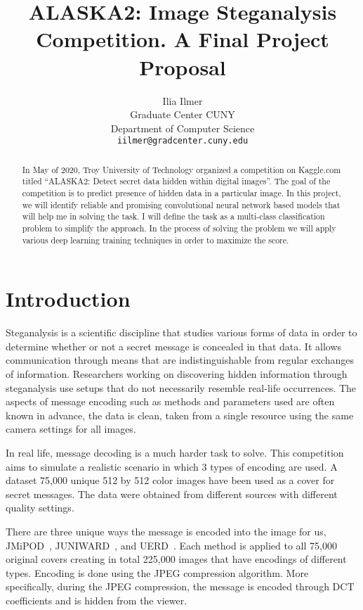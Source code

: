 \documentclass[letterpaper]{article}
\title{ALASKA2: Image Steganalysis Competition. A Final Project Proposal}
\author{
    Ilia Ilmer \\
  Graduate Center CUNY \\
  Department of Computer Science \\
  \texttt{iilmer@gradcenter.cuny.edu} \\
}
\begin{document}
\maketitle
\begin{abstract}
    In May of 2020, Troy University of Technology organized a competition on Kaggle.com titled ``ALASKA2: Detect secret data hidden within digital images''. The goal of the competition is to predict presence of hidden data in a particular image.
    In this project, we will identify reliable and promising convolutional neural network based models that will help me in solving the task. I will define the task as a multi-class classification problem to simplify the approach. In the process of solving the problem we will apply various deep learning training techniques in order to maximize the score.
\end{abstract}

\section{Introduction}

Steganalysis is a scientific discipline that studies various forms of data in order to determine whether or not a secret message is concealed in that data. It allows communication through means that are indistinguishable from regular exchanges of information. Researchers working on discovering hidden information through steganalysis use setups that do not necessarily resemble real-life occurrences. The aspects of message encoding such as methods and parameters used are often known in advance, the data is clean, taken from a single resource using the same camera settings for all images.

In real life, message decoding is a much harder task to solve. This competition aims to simulate a realistic scenario in which 3 types of encoding are used. A dataset 75,000 unique 512 by 512 color images have been used as a cover for secret messages. The data were obtained from different sources with different quality settings.

There are three unique ways the message is encoded into the image for us, JMiPOD~\cite{jmipod}, JUNIWARD~\cite{juniward}, and UERD~\cite{uerd}. Each method is applied to all 75,000 original covers creating in total 225,000 images that have encodings of different types. Encoding is done using the JPEG compression algorithm. More specifically, during the JPEG compression, the message is encoded through DCT coefficients and is hidden from the viewer.
\end{document}
